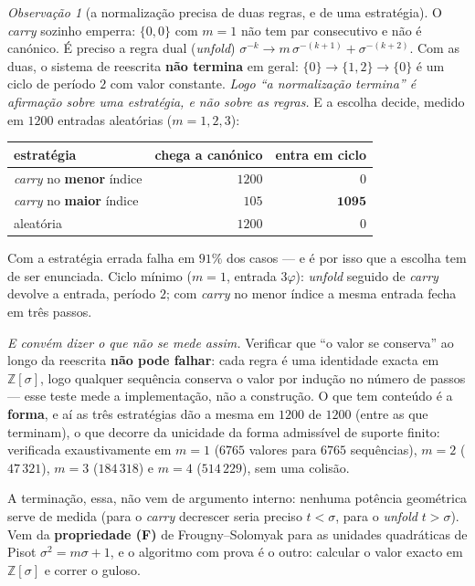 \documentclass[11pt,a4paper]{article}
\theoremstyle{plain}
\theoremstyle{definition}
\theoremstyle{remark}
\newtheorem{obs}[teorema]{Observação}
\newcommand{\Z}{\mathbb{Z}}
\begin{document}
\begin{obs}[a normalização precisa de duas regras, e de uma estratégia]\label{obs:condicoesop}
O \emph{carry} sozinho emperra: $\{0,0\}$ com $m=1$ não tem par consecutivo e não é canónico.
É preciso a regra dual (\emph{unfold}) $\sigma^{-k}\to m\,\sigma^{-(k+1)}+\sigma^{-(k+2)}$. Com as
duas, o sistema de reescrita \textbf{não termina} em geral: $\{0\}\to\{1,2\}\to\{0\}$ é um ciclo de
período $2$ com valor constante. \emph{Logo ``a normalização termina'' é afirmação sobre uma
estratégia, e não sobre as regras.} E a escolha decide, medido em $1200$ entradas aleatórias
($m=1,2,3$):

\begin{center}\small
\begin{tabular}{lrr}
\hline
estratégia & chega a canónico & entra em ciclo \\ \hline
\emph{carry} no \textbf{menor} índice & $1200$ & $0$ \\
\emph{carry} no \textbf{maior} índice & $105$ & $\mathbf{1095}$ \\
aleatória & $1200$ & $0$ \\
\hline
\end{tabular}
\end{center}

\noindent Com a estratégia errada falha em $91\%$ dos casos --- e é por isso que a escolha tem de
ser enunciada. Ciclo mínimo ($m=1$, entrada $3\varphi$): \emph{unfold} seguido de \emph{carry}
devolve a entrada, período $2$; com \emph{carry} no menor índice a mesma entrada fecha em três
passos.

\emph{E convém dizer o que não se mede assim.} Verificar que ``o valor se conserva'' ao longo da
reescrita \textbf{não pode falhar}: cada regra é uma identidade exacta em $\Z[\sigma]$, logo
qualquer sequência conserva o valor por indução no número de passos --- esse teste mede a
implementação, não a construção. O que tem conteúdo é a \textbf{forma}, e aí as três estratégias
dão a mesma em $1200$ de $1200$ (entre as que terminam), o que decorre da unicidade da forma
admissível de suporte finito: verificada exaustivamente em $m=1$ ($6765$ valores para $6765$
sequências), $m=2$ ($47\,321$), $m=3$ ($184\,318$) e $m=4$ ($514\,229$), sem uma colisão.

A terminação, essa, não vem de argumento interno: nenhuma potência geométrica serve de medida
(para o \emph{carry} decrescer seria preciso $t<\sigma$, para o \emph{unfold} $t>\sigma$). Vem da
\textbf{propriedade (F)} de Frougny--Solomyak para as unidades quadráticas de Pisot $\sigma^2=m\sigma+1$,
e o algoritmo com prova é o outro: calcular o valor exacto em $\Z[\sigma]$ e correr o guloso.
\end{obs}
\end{document}
